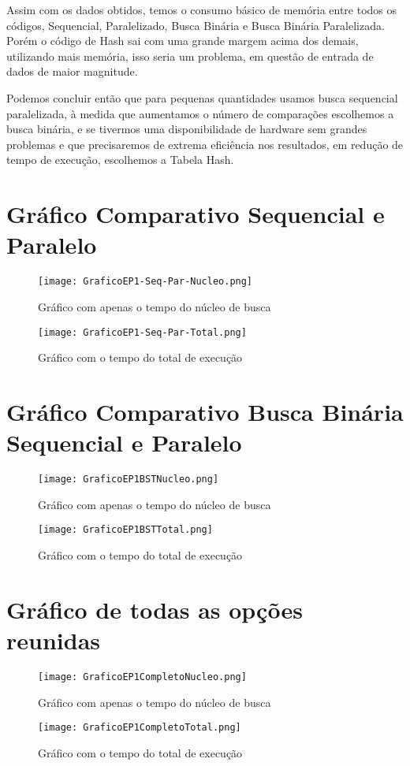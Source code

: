 \documentclass[10pt,journal,compsoc]{IEEEtran}
\begin{document}
Assim com os dados obtidos, temos o consumo básico de memória entre todos os códigos, Sequencial, Paralelizado, Busca Binária e Busca Binária Paralelizada. Porém o código de Hash sai com uma grande margem acima dos demais, utilizando mais memória, isso seria um problema, em questão de entrada de dados de maior magnitude. 

Podemos concluir então que para pequenas quantidades usamos busca sequencial paralelizada, à medida que aumentamos o número de comparações escolhemos a busca binária, e se tivermos uma disponibilidade de hardware sem grandes problemas e que precisaremos de extrema eficiência nos resultados, em redução de tempo de execução, escolhemos a Tabela Hash.


\appendices
\section{Gráfico Comparativo Sequencial e Paralelo}
\begin{figure}[!t]
	\texttt{[image: GraficoEP1-Seq-Par-Nucleo.png]}
	\caption{Gráfico com apenas o tempo do núcleo de busca}
	\label{figSeqNucleo}
\end{figure}
\begin{figure}[!t]
	\texttt{[image: GraficoEP1-Seq-Par-Total.png]}
	\caption{Gráfico com o tempo do total de execução}
	\label{figSeqTotal}
\end{figure}
\newpage

\section{Gráfico Comparativo Busca Binária Sequencial e Paralelo}
\begin{figure}[!t]
	\texttt{[image: GraficoEP1BSTNucleo.png]}
	\caption{Gráfico com apenas o tempo do núcleo de busca}
	\label{figSeqNucleo}
\end{figure}
\begin{figure}[!t]
	\texttt{[image: GraficoEP1BSTTotal.png]}
	\caption{Gráfico com o tempo do total de execução}
	\label{figSeqTotal}
\end{figure}

\section{Gráfico de todas as opções reunidas}
\begin{figure}[!t]
	\texttt{[image: GraficoEP1CompletoNucleo.png]}
	\caption{Gráfico com apenas o tempo do núcleo de busca}
	\label{figCompNucleo}
\end{figure}
\begin{figure}[!t]
	\texttt{[image: GraficoEP1CompletoTotal.png]}
	\caption{Gráfico com o tempo do total de execução}
	\label{figCompTotal}
\end{figure}
\end{document}
